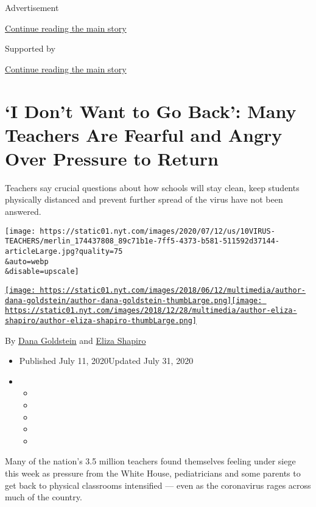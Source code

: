 Advertisement

\protect\hyperlink{after-top}{Continue reading the main story}

Supported by

\protect\hyperlink{after-sponsor}{Continue reading the main story}

\hypertarget{i-dont-want-to-go-back-many-teachers-are-fearful-and-angry-over-pressure-to-return}{%
\section{`I Don't Want to Go Back': Many Teachers Are Fearful and Angry
Over Pressure to
Return}\label{i-dont-want-to-go-back-many-teachers-are-fearful-and-angry-over-pressure-to-return}}

Teachers say crucial questions about how schools will stay clean, keep
students physically distanced and prevent further spread of the virus
have not been answered.

\texttt{[image: https://static01.nyt.com/images/2020/07/12/us/10VIRUS-TEACHERS/merlin\_174437808\_89c71b1e-7ff5-4373-b581-511592d37144-articleLarge.jpg?quality=75\\\&auto=webp\\\&disable=upscale]}

\href{https://www.nytimes.com/by/dana-goldstein}{\texttt{[image: https://static01.nyt.com/images/2018/06/12/multimedia/author-dana-goldstein/author-dana-goldstein-thumbLarge.png]}}\href{https://www.nytimes.com/by/eliza-shapiro}{\texttt{[image: https://static01.nyt.com/images/2018/12/28/multimedia/author-eliza-shapiro/author-eliza-shapiro-thumbLarge.png]}}

By \href{https://www.nytimes.com/by/dana-goldstein}{Dana Goldstein} and
\href{https://www.nytimes.com/by/eliza-shapiro}{Eliza Shapiro}

\begin{itemize}
\item
  Published July 11, 2020Updated July 31, 2020
\item
  \begin{itemize}
  \item
  \item
  \item
  \item
  \item
  \end{itemize}
\end{itemize}

Many of the nation's 3.5 million teachers found themselves feeling under
siege this week as pressure from the White House, pediatricians and some
parents to get back to physical classrooms intensified --- even as the
coronavirus rages across much of the country.

